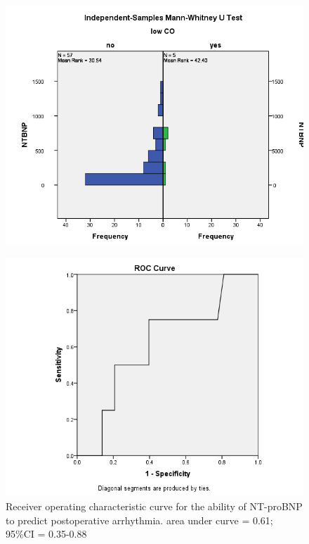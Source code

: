 \documentclass[14pt,a4paper,onecolumn]{extarticle}
\begin{document}
\clearpage
\begin{figure}
    \centering
    \includegraphics[scale=0.7]{../images/manwhit_low_co.png}
    \small\caption{}
    \label{}
\end{figure}

\clearpage
\begin{figure}
    \centering
    \includegraphics[scale=0.7]{../images/roc_arrhythmia.png}
    \small\caption{Receiver operating characteristic curve for the ability of NT-proBNP to predict postoperative arrhythmia.  area under curve = 0.61; 95\%CI = 0.35-0.88}
    \label{}
\end{figure}
\end{document}
